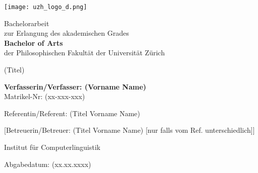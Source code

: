\begin{titlepage}

\texttt{[image: uzh\_logo\_d.png]}\\
\begin{center}

{\sffamily
Bachelorarbeit \\
zur Erlangung des akademischen Grades \\
\textbf{Bachelor of Arts} \\
der Philosophischen Fakultät der Universität Zürich \\

\vspace{2cm}

{\Huge (Titel)}\\

\vspace{4cm}

\textbf{Verfasserin/Verfasser: (Vorname Name)} \\
	Matrikel-Nr: (xx-xxx-xxx) \\

\vspace{2cm}

Referentin/Referent: (Titel Vorname Name)

[Betreuerin/Betreuer: (Titel Vorname Name) {\small [nur falls vom Ref. unterschiedlich]}]

Institut f\"ur Computerlinguistik

\vfill Abgabedatum: (xx.xx.xxxx)

\vspace{3cm}
}
\end{center}

\end{titlepage}

\newpage
